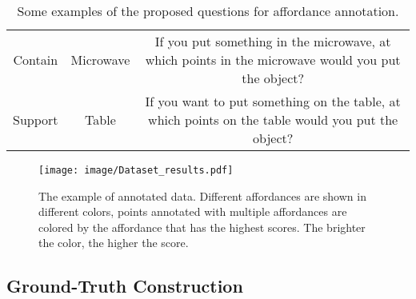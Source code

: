 \documentclass[final]{cvpr}
\begin{document}
\begin{table*}[!htb]
{\begin{tabular}{c|c|c}
         Contain         & Microwave       & If you put something in the microwave, at which points in the microwave would you put the object?                                                \\
         Support             & Table           & If you want to put something on the table, at which points on the table would you put the object?                                                \\ \hline
      \end{tabular}}
   \caption{Some examples of the proposed questions for affordance annotation. }
   \vspace{-0.4cm}
   \label{question_table}
\end{table*}


\begin{figure*}[!ht]
   \begin{center}
      \texttt{[image: image/Dataset\_results.pdf]}
   \end{center}
   \vspace{-0.4cm}
   \caption{The example of annotated data. Different affordances are shown in different colors, points annotated with multiple affordances are colored by the affordance that has the highest scores. The brighter the color, the higher the score.}
   \label{dataset image}
   \vspace{-0.5cm}
\end{figure*}


\subsection{Ground-Truth Construction}
\end{document}
